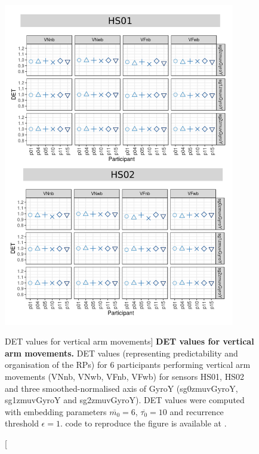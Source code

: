 \begin{figure}
\centering
\includegraphics[width=0.9\textwidth]{rqa_det_V_w500}
    \caption
	[DET values for vertical arm movements]{
	{\bf DET values for vertical arm movements.}	
    	DET values (representing predictability and organisation of the RPs)
	for 6 participants performing vertical arm movements 
	(VNnb, VNwb, VFnb, VFwb)
	for sensors HS01, HS02 and three smoothed-normalised axis 
	of GyroY (sg0zmuvGyroY, sg1zmuvGyroY and sg2zmuvGyroY).
	DET values were computed with 
	embedding parameters $\overline{m_0}=6$, $\overline{\tau_0}=10$ and
	recurrence threshold $\epsilon=1$.
		\R code to reproduce the figure is available at 
		.
        }
    \label{fig:rqa_det_V}
\end{figure}



